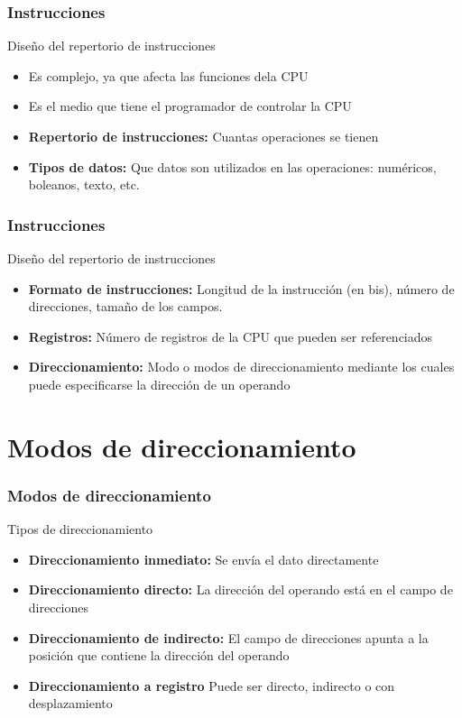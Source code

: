 \documentclass{beamer}
\begin{document}
\begin{frame}
		\frametitle{Instrucciones}
		\begin{block}{Diseño del repertorio de instrucciones}
		\begin{itemize}
			\item Es complejo, ya que afecta las funciones dela CPU
			\item Es el medio que tiene el programador de controlar la CPU
			\item \textbf{Repertorio de instrucciones:} Cuantas operaciones se tienen
			\item \textbf{Tipos de datos:} Que datos son utilizados en las operaciones: numéricos, boleanos, texto, etc.	
		\end{itemize}
	\end{block}		 		
\end{frame}


\begin{frame}
		\frametitle{Instrucciones}
		\begin{block}{Diseño del repertorio de instrucciones}
		\begin{itemize}
			\item \textbf{Formato de instrucciones:} Longitud de la instrucción (en bis), número de direcciones, tamaño de los campos.
			\item \textbf{Registros:} Número de registros de la CPU que pueden ser referenciados
			\item \textbf{Direccionamiento:} Modo o modos de direccionamiento mediante los cuales puede especificarse la dirección de un operando	
		\end{itemize}
	\end{block}		 		
\end{frame}



\section{Modos de direccionamiento}

\begin{frame}
		\frametitle{Modos de direccionamiento}
		\begin{block}{Tipos de direccionamiento}
		\begin{itemize}
			\item \textbf{Direccionamiento inmediato:} Se envía el dato directamente
			\item \textbf{Direccionamiento directo:} La dirección del operando está en el campo de direcciones
			\item \textbf{Direccionamiento de indirecto:} El campo de direcciones apunta a la posición que contiene la dirección del operando
			\item \textbf{Direccionamiento a registro} Puede ser directo, indirecto o con desplazamiento	
		\end{itemize}
	\end{block}		 		
\end{frame}
\end{document}
